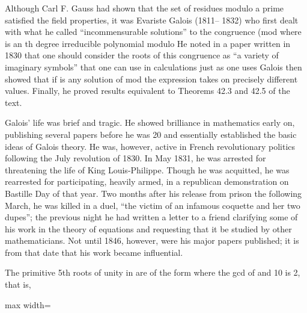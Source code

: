 \documentclass[11pt,oneside]{article}
\begin{document}
\begin{BookBody}

 \BookEnd{\blacksquare}

\noindent Although Carl F. Gauss had shown that the set of residues modulo a prime  satisfied the field properties, it was Evariste Galois (1811– 1832) who first dealt with what he called “incommensurable solutions” to the congruence  (mod  where  is an th degree irreducible polynomial modulo  He noted in a paper written in 1830 that one should consider the roots of this congruence as “a variety of imaginary symbols” that one can use in calculations just as one uses  Galois then showed that if \BookInline{\alpha } is any solution of mod  the expression   takes on precisely  different values. Finally, he proved results equivalent to Theorems 42.3 and 42.5 of the text.

\noindent Galois’ life was brief and tragic. He showed brilliance in mathematics early on, publishing several papers before he was 20 and essentially established the basic ideas of Galois theory. He was, however, active in French revolutionary politics following the July revolution of 1830. In May 1831, he was arrested for threatening the life of King Louis-Philippe. Though he was acquitted, he was rearrested for participating, heavily armed, in a republican demonstration on Bastille Day of that year. Two months after his release from prison the following March, he was killed in a duel, “the victim of an infamous coquette and her two dupes”; the previous night he had written a letter to a friend clarifying some of his work in the theory of equations and requesting that it be studied by other mathematicians. Not until 1846, however, were his major papers published; it is from that date that his work became influential.

\noindent The primitive 5th roots of unity in  are of the form  where the gcd of  and 10 is 2, that is,

\begin{center}\begin{adjustbox}{max width=\linewidth}\end{adjustbox}\end{center}


\end{BookBody}
\end{document}
